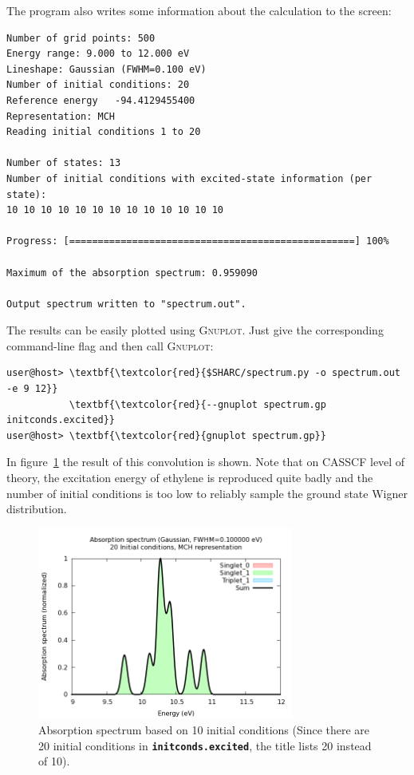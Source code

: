 \documentclass[a4paper,11pt,DIV=15,openany]{scrbook}
\newcommand{\ttt}[1]{\textbf{\texttt{#1}}}
\begin{document}
The program also writes some information about the calculation to the screen:
\begin{oframed}
\footnotesize\begin{Verbatim}[commandchars=\\\{\}]
Number of grid points: 500
Energy range: 9.000 to 12.000 eV
Lineshape: Gaussian (FWHM=0.100 eV)
Number of initial conditions: 20
Reference energy   -94.4129455400
Representation: MCH
Reading initial conditions 1 to 20

Number of states: 13
Number of initial conditions with excited-state information (per state):
10 10 10 10 10 10 10 10 10 10 10 10 10 

Progress: [==================================================] 100%

Maximum of the absorption spectrum: 0.959090

Output spectrum written to "spectrum.out".
\end{Verbatim}
\end{oframed}

\normalsize
The results can be easily plotted using \textsc{Gnuplot}. Just give the corresponding command-line flag and then call \textsc{Gnuplot}:
\begin{Verbatim}[commandchars=\\\{\}]
user@host> \textbf{\textcolor{red}{$SHARC/spectrum.py -o spectrum.out -e 9 12}}
           \textbf{\textcolor{red}{--gnuplot spectrum.gp initconds.excited}}
user@host> \textbf{\textcolor{red}{gnuplot spectrum.gp}}
\end{Verbatim}


In figure~\ref{fig:spectrum} the result of this convolution is shown. Note that on CASSCF level of theory, the excitation energy of ethylene is reproduced quite badly and the number of initial conditions is too low to reliably sample the ground state Wigner distribution.

\begin{figure}[h]
  \centering
  \includegraphics[width=0.75\textwidth]{figures/spectrum.png}
  \caption{Absorption spectrum based on 10 initial conditions (Since there are 20 initial conditions in \ttt{initconds.excited}, the title lists 20 instead of 10).}
  \label{fig:spectrum}
\end{figure}
\end{document}
